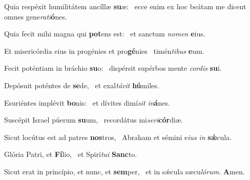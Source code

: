 \item Quia respéxit humilitátem ancíllæ \textbf{su}æ:~\psstar{} ecce enim ex hoc beátam me dicent omnes gene\textit{rati}\textbf{ó}nes.

\item Quia fecit mihi magna qui \textbf{pot}ens est:~\psstar{} et sanctum \textit{nomen} \textbf{e}ius.

\item Et misericórdia eius in progénies et pro\textbf{gé}nies~\psstar{} timén\textit{tibus} \textbf{e}um.

\item Fecit poténtiam in bráchio \textbf{su}o:~\psstar{} dispérsit supérbos mente \textit{cordis} \textbf{su}i.

\item Depósuit poténtes de \textbf{se}de,~\psstar{} et exal\textit{távit} \textbf{hú}miles.

\item Esuriéntes implévit \textbf{bo}nis:~\psstar{} et dívites dimí\textit{sit} \textit{in}\textbf{á}nes.

\item Suscépit Israel púerum \textbf{su}um,~\psstar{} recordátus mi\textit{seri}\textbf{cór}diæ.

\item Sicut locútus est ad patres \textbf{nos}tros,~\psstar{} Abraham et sémini e\textit{ius} \textit{in} \textbf{sǽ}cula.

\item Glória Patri, et \textbf{Fí}lio,~\psstar{} et Spirí\textit{tui} \textbf{Sanc}to.

\item Sicut erat in princípio, et nunc, et \textbf{sem}per,~\psstar{} et in sǽcula sæcu\textit{lórum}. \textbf{A}men.